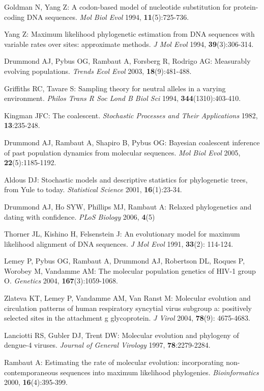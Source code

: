 \documentclass[cup7b, english]{cupbook}
\begin{document}
\begin{thebibliography}{77}
Goldman N, Yang Z: A codon-based model of nucleotide
substitution for protein-coding DNA sequences. \emph{Mol Biol Evol}
1994, \textbf{11}(5):725-736.

Yang Z: Maximum likelihood phylogenetic estimation
from DNA sequences with variable rates over sites: approximate methods.
\emph{J Mol Evol} 1994, \textbf{39}(3):306-314.

Drummond AJ, Pybus OG, Rambaut A, Forsberg R,
Rodrigo AG: Measurably evolving populations. \emph{Trends Ecol Evol}
2003, \textbf{18}(9):481-488.

Griffiths RC, Tavare S: Sampling theory for neutral
alleles in a varying environment. \emph{Philos Trans R Soc Lond B
Biol Sci} 1994, \textbf{344}(1310):403-410.

Kingman JFC: The coalescent. \emph{Stochastic
Processes and Their Applications} 1982, \textbf{13}:235-248.

Drummond AJ, Rambaut A, Shapiro B, Pybus OG: Bayesian
coalescent inference of past population dynamics from molecular sequences.
\emph{Mol Biol Evol} 2005, \textbf{22}(5):1185-1192.

Aldous DJ: Stochastic models and descriptive
statistics for phylogenetic trees, from Yule to today. \emph{Statistical
Science} 2001, \textbf{16}(1):23-34.

Drummond AJ, Ho SYW, Phillips MJ, Rambaut A: Relaxed
phylogenetics and dating with confidence. \emph{PLoS Biology} 2006,
\textbf{4}(5)

Thorner JL, Kishino H, Felsenstein J: An evolutionary
model for maximum likelihood alignment of DNA sequences. \emph{J Mol
Evol} 1991, \textbf{33}(2): 114-124.

Lemey P, Pybus OG, Rambaut A, Drummond AJ,
Robertson DL, Roques P, Worobey M, Vandamme AM: The molecular population
genetics of HIV-1 group O. \emph{Genetics} 2004, \textbf{167}(3):1059-1068.

Zlateva KT, Lemey P, Vandamme AM, Van Ranst M: Molecular
evolution and circulation patterns of human respiratory syncytial virus
subgroup a: positively selected sites in the attachment g glycoprotein. \emph{J
Virol} 2004, \textbf{78}(9): 4675-4683.

Lanciotti RS, Gubler DJ, Trent DW: Molecular evolution and
phylogeny of dengue-4 viruses.  \emph{Journal of General Virology} 1997,
\textbf{78}:2279-2284.

Rambaut A: Estimating the rate of molecular evolution: incorporating
non-contemporaneous sequences into maximum likelihood phylogenies.
\emph{Bioinformatics} 2000, \textbf{16}(4):395-399.

\end{thebibliography}
\end{document}
